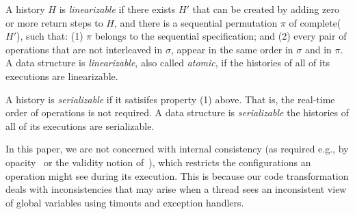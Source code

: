 A history $H$ is \emph{linearizable}
\cite{HerlihyW1990} if there exists $H'$ that can be created by adding zero or more 
return steps to $H$, and there is a sequential permutation $\pi$ of complete($H'$), 
such that: (1) $\pi$ belongs to the sequential specification; and 
(2) every pair of operations that are not interleaved in $\sigma$, appear in the same order in $\sigma$ and in $\pi$. 
A data structure  is \emph{linearizable}, also called \emph{atomic}, if the histories of all of its executions are linearizable.

A history is \emph{serializable} if it satisifes property (1) above. That is, the real-time order of operations is not required.
A data structure  is \emph{serializable} the histories of all of its executions are serializable.

In this paper, we are not concerned with internal consistency (as required e.g., by opacity~\cite{GuerraouiK2008} or the validity notion of~\cite{LevAriCK2014}), which 
restricts the configurations an operation might see during its execution. 
This is because our code transformation deals with inconsistencies that may arise when a thread sees an inconsistent view of global variables using 
timouts and exception handlers.   
